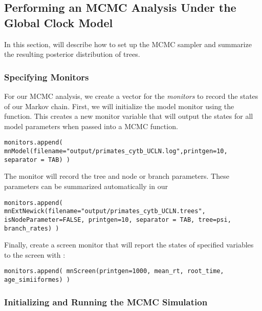 \bigskip
\subsection{Performing an MCMC Analysis Under the Global Clock Model}

In this section, will describe how to set up the MCMC sampler and summarize the resulting posterior distribution of trees. 

\subsubsection{Specifying Monitors}

For our MCMC analysis, we create a vector for the \textit{monitors} to record the states of our Markov chain. 
First, we will initialize the model monitor using the  function. 
This creates a new monitor variable that will output the states for all model parameters when passed into a MCMC function. 
{\tt \begin{snugshade*}
\begin{lstlisting}
monitors.append( mnModel(filename="output/primates_cytb_UCLN.log",printgen=10, separator = TAB) )
\end{lstlisting}
\end{snugshade*}}

The  monitor will record the tree and node or branch parameters.
These parameters can be summarized automatically in our 
{\tt \begin{snugshade*}
\begin{lstlisting}
monitors.append( mnExtNewick(filename="output/primates_cytb_UCLN.trees", isNodeParameter=FALSE, printgen=10, separator = TAB, tree=psi, branch_rates) )
\end{lstlisting}
\end{snugshade*}}

Finally, create a screen monitor that will report the states of specified variables to the screen with :
{\tt \begin{snugshade*}
\begin{lstlisting}
monitors.append( mnScreen(printgen=1000, mean_rt, root_time, age_simiiformes) )
\end{lstlisting}
\end{snugshade*}}

\subsubsection{Initializing and Running the MCMC Simulation}

